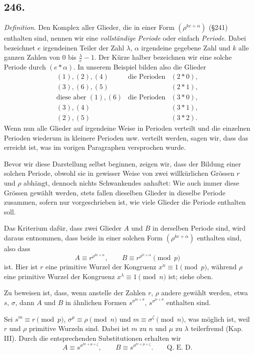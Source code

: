 \documentclass[12pt]{article}
\begin{document}
\subsection*{246.}
\textit{Definition.} Den Komplex aller Glieder, die in einer Form $(\rho^{ke+\alpha})$ (§241) enthalten sind, nennen wir eine \textit{vollständige Periode} oder einfach \textit{Periode}. Dabei bezeichnet $e$ irgendeinen Teiler der Zahl $\lambda$, $\alpha$ irgendeine gegebene Zahl und $k$ alle ganzen Zahlen von $0$ bis $\frac{\lambda}{e}-1$. Der Kürze halber bezeichnen wir eine solche Periode durch $(e*\alpha)$. In unserem Beispiel bilden also die Glieder
\[
\begin{array}{rcl}
(1),(2),(4)&\text{die Perioden}&(2*0),\\
(3),(6),(5)&& (2*1),\\[2pt]
\text{diese aber }(1),(6)&\text{die Perioden}&(3*0),\\
(3),(4)&& (3*1),\\
(2),(5)&& (3*2).
\end{array}
\]
Wenn nun alle Glieder auf irgendeine Weise in Perioden verteilt und die einzelnen Perioden wiederum in kleinere Perioden usw. verteilt werden, sagen wir, dass das erreicht ist, was im vorigen Paragraphen versprochen wurde.

Bevor wir diese Darstellung selbst beginnen, zeigen wir, dass der Bildung einer solchen Periode, obwohl sie in gewisser Weise von zwei willkürlichen Grössen $r$ und $\rho$ abhängt, dennoch nichts Schwankendes anhaftet: Wie auch immer diese Grössen gewählt werden, stets fallen dieselben Glieder in dieselbe Periode zusammen, sofern nur vorgeschrieben ist, wie viele Glieder die Periode enthalten soll.

Das Kriterium dafür, dass zwei Glieder $A$ und $B$ in derselben Periode sind, wird daraus entnommen, dass beide in einer solchen Form $(\rho^{ke+\alpha})$ enthalten sind, also dass
\[
A\equiv r^{\rho^{ke+\alpha}},\qquad B\equiv r^{\rho^{le+\alpha}}\pmod p
\]
ist. Hier ist $r$ eine primitive Wurzel der Kongruenz $x^n\equiv 1\pmod p$, während $\rho$ eine primitive Wurzel der Kongruenz $x^\lambda\equiv 1\pmod n$ ist; siehe oben.

Zu beweisen ist, dass, wenn anstelle der Zahlen $r$, $\rho$ andere gewählt werden, etwa $s$, $\sigma$, dann $A$ und $B$ in ähnlichen Formen $s^{\sigma^{ke+\theta}}$, $s^{\sigma^{le+\theta}}$ enthalten sind.

Sei $s^m\equiv r\pmod p$, $\sigma^\mu\equiv \rho\pmod n$ und $m\equiv \sigma^\zeta\pmod n$, was möglich ist, weil $r$ und $\rho$ primitive Wurzeln sind. Dabei ist $m$ zu $n$ und $\mu$ zu $\lambda$ teilerfremd (Kap. III). Durch die entsprechenden Substitutionen erhalten wir
\[
A\equiv s^{\sigma^{ke+\mu+\zeta}},\qquad B\equiv s^{\sigma^{le+\mu+\zeta}}. \qquad \text{Q. E. D.}
\]
\end{document}
